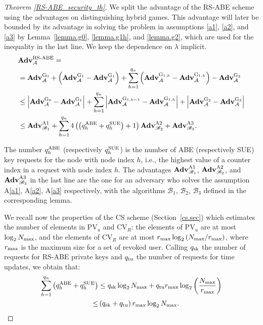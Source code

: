 \documentclass[a4paper,10pt]{article}
\newcommand{\adv}{\textbf{Adv}}
\begin{document}
\begin{proof}[Theorem \ref{RS-ABE_security_th}]
	We split the advantage of the RS-ABE scheme using the advantages on distinguishing hybrid games. This advantage will later be bounded by its advantage in solving the problem in assumptions \ref{a1}, \ref{a2}, and \ref{a3} by Lemma~\ref{lemma.g0}, \ref{lemma.g1h}, and \ref{lemma.g2}, which are used for the inequality in the last line.
	We keep the dependence on $\lambda$ implicit.
	\begin{align*}
		&\adv_{\mathcal{A}}^{\textnormal{RS-ABE}} =\\ 
		&=\adv_{\mathcal{A}}^{\textnormal{G}_0} + \left(\adv_{\mathcal{A}}^{\textnormal{G}_1}-\adv_{\mathcal{A}}^{\textnormal{G}_1}\right) + \sum_{h=1}^{q_n} \left( \adv_{\mathcal{A}}^{\textnormal{G}_{1,h}}-\adv_{\mathcal{A}}^{\textnormal{G}_{1,h}} \right) -\adv_{\mathcal{A}}^{\textnormal{G}_{3}} \\
		&\leq \left| \adv_{\mathcal{A}}^{\textnormal{G}_0} - \adv_{\mathcal{A}}^{\textnormal{G}_1}\right| + \sum_{h=1}^{q_n} \left| \adv_{\mathcal{A}}^{\textnormal{G}_{1,h-1}}-\adv_{\mathcal{A}}^{\textnormal{G}_{1,h}} \right| + \left| \adv_{\mathcal{A}}^{\textnormal{G}_2} - \adv_{\mathcal{A}}^{\textnormal{G}_3}\right| \\
		&\leq \adv_{\mathscr{B}_1}^{\textnormal{A1}} + \sum_{h=1}^{q_n} 4\left(\left(q_{h}^\textnormal{ABE}+q_{h}^\textnormal{SUE}\right)+1\right)\adv_{\mathscr{B}_2}^{\textnormal{A2}} + \adv_{\mathscr{B}_3}^{\textnormal{A3}}.
	\end{align*}
	
	The number $q_{h}^{\textnormal{ABE}}$ (respectively $q_{h}^{\textnormal{SUE}}$) is the number of ABE (respectively SUE) key requests for the node with node index $h$, i.e., the highest value of a counter index in a request with node index $h$.
	The advantages $\adv_{\mathscr{B}_1}^{\textnormal{A1}}$, $\adv_{\mathscr{B}_2}^{\textnormal{A2}}$, and $\adv_{\mathscr{B}_3}^{\textnormal{A3}}$ in the last line are the one for an adversary who solves the assumption A\ref{a1}, A\ref{a2}, A\ref{a3} respectively, with the algorithms $\mathscr{B}_1$, $\mathscr{B}_2$,  $\mathscr{B}_3$ defined in the corresponding lemma.
	
	We recall now the properties of the CS scheme (Section~\ref{cs.sec}) which estimates the number of elements in $\mathrm{PV}_u$ and $\mathrm{CV}_R$: the elements of $\mathrm{PV}_u$ are at most $\log_2 N_\textnormal{max}$, and the elements of $\mathrm{CV}_R$ are at most $r_\textnormal{max}\log_2\left({N_\textnormal{max}}/{r_\textnormal{max}}\right)$, where $r_\textnormal{max}$ is the maximum size for a set of revoked user. Calling $q_{\textnormal{sk}}$ the number of requests for RS-ABE private keys and $q_{\textnormal{tu}}$ the number of requests for time updates, we obtain that:
	\begin{align*}
		\sum_{h=1}^{q_n}\left(q_{h}^{\textnormal{ABE}}+q_{h}^{\textnormal{SUE}}\right) 
		&\leq q_{\textnormal{sk}}\log_2 N_\textnormal{max} + q_{\textnormal{tu}} r_\textnormal{max} \log_2\left( \frac{N_\textnormal{max}}{r_\textnormal{max}}\right) \\
		\leq& \left(q_{\textnormal{sk}}+q_{\textnormal{tu}}\right) r_\textnormal{max} \log_2 N_\textnormal{max}.
	\end{align*}
	

\end{proof}
\end{document}
